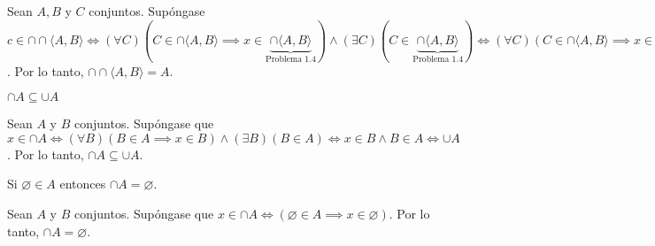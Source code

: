 \begin{dem}
	Sean $A,B$ y $C$ conjuntos. Supóngase $c\in\cap \cap \langle A, B\rangle \iff (\forall C)(C\in\cap \langle A, B\rangle \implies x\in  \underbrace{\cap \langle A, B\rangle}_{\text{Problema 1.4}})\wedge (\exists C)(C\in \underbrace{\cap \langle A, B\rangle}_{\text{Problema 1.4}} ) \iff (\forall C)(C\in\cap \langle A, B\rangle \implies x\in \{A\})\wedge (\exists C)(C\in \{A\} )\iff (\forall C)(C\in\cap \langle A, B\rangle \implies x\in \{A\})\wedge (C=A )\iff x\in A$. Por lo tanto, $\cap \cap \langle A, B\rangle=A$.
\end{dem}
\begin{problema}
	$\cap A \subseteq \cup A$
\end{problema}

\begin{dem}
	Sean $A$ y $B$ conjuntos. Supóngase que $x\in \cap A\iff (\forall B)(B\in A \implies x\in B)\wedge (\exists B)(B\in A)\iff x\in B\wedge B\in A\iff \cup A$. Por lo tanto, $\cap A \subseteq \cup A$.
\end{dem}
\begin{problema}
	Si $\varnothing\in A$ entonces $\cap A=\varnothing$. 
\end{problema}

\begin{dem}
	Sean $A$ y $B$ conjuntos. Supóngase que $x\in \cap A\iff (\varnothing\in A \implies x \in\varnothing)$. Por lo tanto, $\cap A=\varnothing$.
\end{dem}





